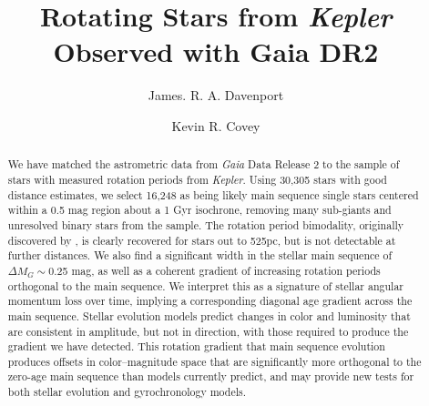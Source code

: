 \documentclass[trackchanges,preprint2]{aastex62}
\newcommand{\Kepler}{\textsl{Kepler}\xspace}
\begin{document}
\title{Rotating Stars from \Kepler Observed with Gaia DR2}

\shorttitle{Rotating Stars from \Kepler Observed with Gaia DR2}



\author{James. R. A. Davenport}


\author{Kevin R. Covey}


 
 

\begin{abstract}
We have matched the astrometric data from {\em Gaia} Data Release 2 to the sample of stars with measured rotation periods from \Kepler. Using 30,305 stars with good distance estimates, we select 16,248 as being likely main sequence single stars centered within a 0.5 mag region about a 1 Gyr isochrone, removing many sub-giants and unresolved binary stars from the sample.
The rotation period bimodality, originally discovered by \citet{mcquillan2013}, is clearly recovered for stars out to 525pc, but is not detectable at further distances. 
We also find a significant width in the stellar main sequence of $\Delta M_G\sim$0.25 mag, as well as a coherent gradient of increasing rotation periods orthogonal to the main sequence.
We interpret this as a signature of stellar angular momentum loss over time, implying a corresponding diagonal age gradient across the main sequence. Stellar evolution models predict changes in color and luminosity that are consistent in amplitude, but not in direction, with those required to produce the gradient we have detected. This rotation gradient  that main sequence evolution produces offsets in color--magnitude space that are significantly more orthogonal to the zero-age main sequence than models currently predict, and may provide new tests for both stellar evolution and gyrochronology models.
\end{abstract}
\end{document}
